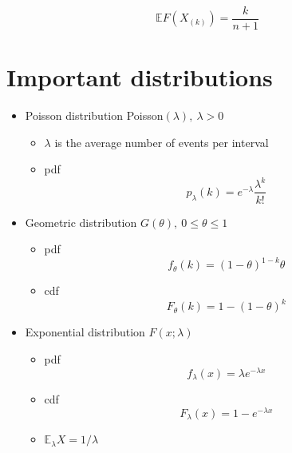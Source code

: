\documentclass[12pt]{article}
\newcommand{\EE}{\mathbb{E}}
\begin{document}
\begin{equation}\label{kth_order_expectation}
	\mathbb{E}F(X_{(k)}) = \frac k{n+1}
\end{equation}




\section{Important distributions}
\begin{itemize}
	\item Poisson distribution Poisson$(\lambda),\ \lambda > 0$
	\begin{itemize}
		\item $\lambda$ is the average number of events per interval
		\item pdf
		\begin{equation}\label{poisson_pdf}
			p_\lambda(k) = e^{-\lambda}\frac {\lambda^k}{k!}
		\end{equation}
	\end{itemize}


	\item Geometric distribution $G(\theta),\ 0\leq\theta\leq 1$
	\begin{itemize}
		\item pdf
		\begin{equation}\label{geometric_pdf}
			f_\theta(k) = (1-\theta)^{1-k}\theta
		\end{equation}
		\item cdf
		\begin{equation}\label{geometric_cdf}
			F_\theta(k) = 1-(1-\theta)^k
		\end{equation}
	\end{itemize}

	\item Exponential distribution $F(x;\lambda)$
	\begin{itemize}
		\item pdf
		\begin{equation}\label{exponential_pdf}
			f_\lambda(x) = \lambda e^{-\lambda x}
		\end{equation}
		\item cdf
		\begin{equation}\label{exponential_cdf}
			F_\lambda(x) = 1 - e^{-\lambda x}
		\end{equation}
		\item $\EE_\lambda X = 1/\lambda$

	\end{itemize}


\end{itemize}
\end{document}

